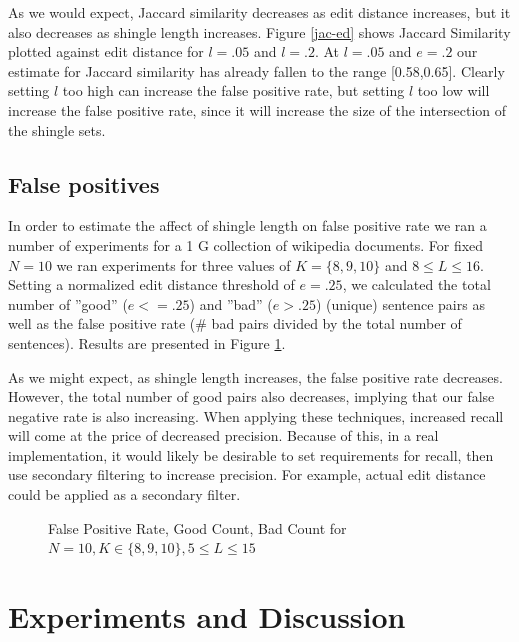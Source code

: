 \documentclass{acm_proc_article-sp}
\begin{document}
As we would expect, Jaccard similarity decreases as edit distance increases, but it also decreases as shingle length increases. Figure \ref{jac-ed} shows Jaccard Similarity plotted against edit distance for $l = .05$ and $l = .2$. At $l = .05$ and $e = .2$ our estimate for Jaccard similarity has already fallen to the range [0.58,0.65]. Clearly setting $l$ too high can increase the false positive rate, but setting $l$ too low will increase the false positive rate, since it will increase the size of the intersection of the shingle sets.

\subsection{False positives}

In order to estimate the affect of shingle length on false positive rate we ran a number of experiments for a 1 G collection of wikipedia documents. For fixed $N=10$ we ran experiments for three values of $K=\{8,9,10\}$ and $8 \le L \le 16$. Setting a normalized edit distance threshold of $e = .25$, we calculated the total number of ''good'' ($e <= .25$) and ''bad'' ($e > .25$) (unique) sentence pairs as well as the false positive rate (\# bad pairs divided by the total number of sentences). Results are presented in Figure \ref{ed-grid}.

As we might expect, as shingle length increases, the false positive rate decreases. However, the total number of good pairs also decreases, implying that our false negative rate is also increasing. When applying these techniques, increased recall will come at the price of decreased precision. Because of this, in a real implementation, it would likely be desirable to set requirements for recall, then use secondary filtering to increase precision. For example, actual edit distance could be applied as a secondary filter.

\begin{figure}
\centering
{}
\caption{False Positive Rate, Good Count, Bad Count for $N=10, K \in \{8,9,10\}, 5 \le L \le 15$}
\label{ed-grid}
\end{figure}

\section{Experiments and Discussion}

\end{document}
